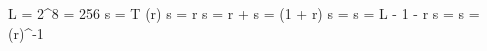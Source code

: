 %
%

L = 2^8 = 256
s = T (r)
s =  \times r
s = r + 
s =  \times \log(1 + r)
s = 
s = L - 1 - r
s = 
s = \exp(r)^-1
